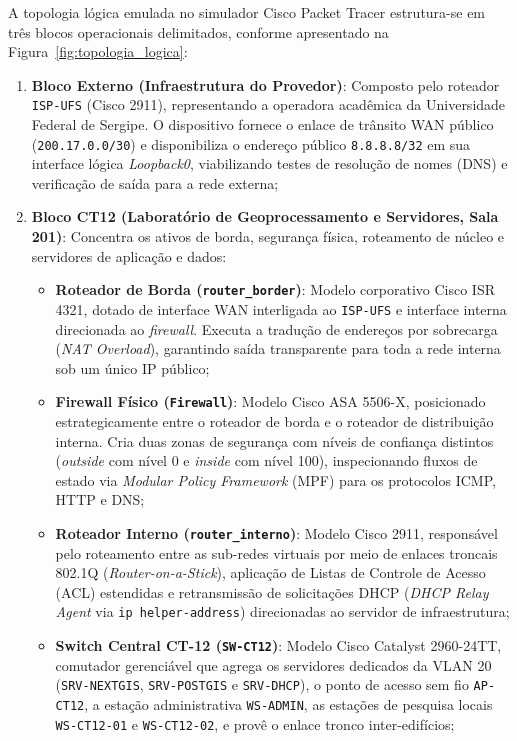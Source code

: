 A topologia lógica emulada no simulador Cisco Packet Tracer estrutura-se em três blocos operacionais delimitados, conforme apresentado na Figura~\ref{fig:topologia_logica}:
\begin{enumerate}
    \item \textbf{Bloco Externo (Infraestrutura do Provedor)}: Composto pelo roteador \texttt{ISP-UFS} (Cisco 2911), representando a operadora acadêmica da Universidade Federal de Sergipe. O dispositivo fornece o enlace de trânsito WAN público (\texttt{200.17.0.0/30}) e disponibiliza o endereço público \texttt{8.8.8.8/32} em sua interface lógica \textit{Loopback0}, viabilizando testes de resolução de nomes (DNS) e verificação de saída para a rede externa;
    \item \textbf{Bloco CT12 (Laboratório de Geoprocessamento e Servidores, Sala 201)}: Concentra os ativos de borda, segurança física, roteamento de núcleo e servidores de aplicação e dados:
    \begin{itemize}
        \item \textbf{Roteador de Borda (\texttt{router\_border})}: Modelo corporativo Cisco ISR 4321, dotado de interface WAN interligada ao \texttt{ISP-UFS} e interface interna direcionada ao \textit{firewall}. Executa a tradução de endereços por sobrecarga (\textit{NAT Overload}), garantindo saída transparente para toda a rede interna sob um único IP público;
        \item \textbf{Firewall Físico (\texttt{Firewall})}: Modelo Cisco ASA 5506-X, posicionado estrategicamente entre o roteador de borda e o roteador de distribuição interna. Cria duas zonas de segurança com níveis de confiança distintos (\textit{outside} com nível 0 e \textit{inside} com nível 100), inspecionando fluxos de estado via \textit{Modular Policy Framework} (MPF) para os protocolos ICMP, HTTP e DNS;
        \item \textbf{Roteador Interno (\texttt{router\_interno})}: Modelo Cisco 2911, responsável pelo roteamento entre as sub-redes virtuais por meio de enlaces troncais 802.1Q (\textit{Router-on-a-Stick}), aplicação de Listas de Controle de Acesso (ACL) estendidas e retransmissão de solicitações DHCP (\textit{DHCP Relay Agent} via \texttt{ip helper-address}) direcionadas ao servidor de infraestrutura;
        \item \textbf{Switch Central CT-12 (\texttt{SW-CT12})}: Modelo Cisco Catalyst 2960-24TT, comutador gerenciável que agrega os servidores dedicados da VLAN 20 (\texttt{SRV-NEXTGIS}, \texttt{SRV-POSTGIS} e \texttt{SRV-DHCP}), o ponto de acesso sem fio \texttt{AP-CT12}, a estação administrativa \texttt{WS-ADMIN}, as estações de pesquisa locais \texttt{WS-CT12-01} e \texttt{WS-CT12-02}, e provê o enlace tronco inter-edifícios;

\end{itemize}
\end{enumerate}
